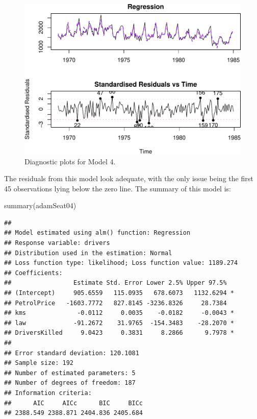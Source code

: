 \documentclass[
]{book}
\newenvironment{Shaded}{\begin{snugshade}}{\end{snugshade}}
\newcommand{\FunctionTok}[1]{\textcolor[rgb]{0.00,0.00,0.00}{#1}}
\newcommand{\NormalTok}[1]{#1}
\theoremstyle{definition}
\theoremstyle{definition}
\theoremstyle{definition}
\theoremstyle{definition}
\theoremstyle{remark}
\begin{document}
\begin{figure}
\centering
\includegraphics{Svetunkov--2022----ADAM_files/figure-latex/adamSeat04-1.pdf}
\caption{\label{fig:adamSeat04}Diagnostic plots for Model 4.}
\end{figure}

The residuals from this model look adequate, with the only issue being the first 45 observations lying below the zero line. The summary of this model is:

\begin{Shaded}
\begin{Highlighting}[]
\FunctionTok{summary}\NormalTok{(adamSeat04)}
\end{Highlighting}
\end{Shaded}

\begin{verbatim}
## 
## Model estimated using alm() function: Regression
## Response variable: drivers
## Distribution used in the estimation: Normal
## Loss function type: likelihood; Loss function value: 1189.274
## Coefficients:
##                 Estimate Std. Error Lower 2.5% Upper 97.5%  
## (Intercept)     905.6559   115.0935   678.6073   1132.6294 *
## PetrolPrice   -1603.7772   827.8145 -3236.8326     28.7384  
## kms              -0.0112     0.0035    -0.0182     -0.0043 *
## law             -91.2672    31.9765  -154.3483    -28.2070 *
## DriversKilled     9.0423     0.3831     8.2866      9.7978 *
## 
## Error standard deviation: 120.1081
## Sample size: 192
## Number of estimated parameters: 5
## Number of degrees of freedom: 187
## Information criteria:
##      AIC     AICc      BIC     BICc 
## 2388.549 2388.871 2404.836 2405.684
\end{verbatim}
\end{document}
